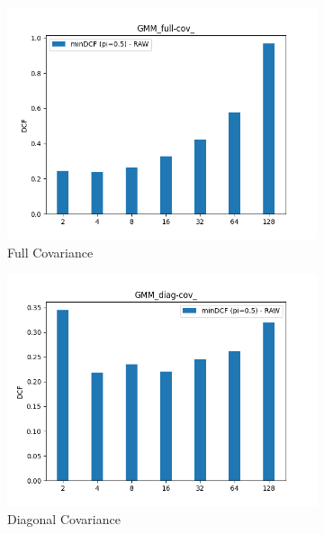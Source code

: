 \documentclass[english]{report}
\begin{document}
\begin{figure}[h!]
    \begin{subfigure}{0.4\textwidth}
        \includegraphics[scale=0.4]{../../images/evaluation/GMM_full-cov_component_comparison}
        \caption{Full Covariance}
    \end{subfigure}
    \begin{subfigure}{0.4\textwidth}
        \includegraphics[scale=0.4]{../../images/evaluation/GMM_diag-cov_component_comparison}
        \caption{Diagonal Covariance}
    \end{subfigure}
    \begin{subfigure}{0.4\textwidth}

\end{subfigure}
\end{figure}
\end{document}
